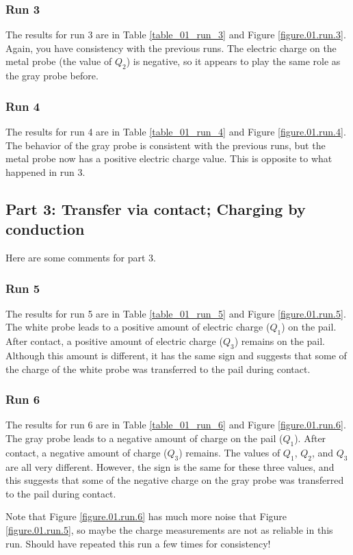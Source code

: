 \subsubsection{Run 3}
%
The results for run 3 are in Table \ref{table_01_run_3} and Figure \ref{figure.01.run.3}. Again, you have consistency with the previous runs. The electric charge on the metal probe (the value of $Q_{2}$) is negative, so it appears to play the same role as the gray probe before.
%
\subsubsection{Run 4}
%
The results for run 4 are in Table \ref{table_01_run_4} and Figure \ref{figure.01.run.4}. The behavior of the gray probe is consistent with the previous runs, but the metal probe now has a positive electric charge value. This is opposite to what happened in run 3.
%
\subsection{Part 3: Transfer via contact; Charging by conduction}
%
Here are some comments for part 3.
%
\subsubsection{Run 5}
%
The results for run 5 are in Table \ref{table_01_run_5} and Figure \ref{figure.01.run.5}. The white probe leads to a positive amount of electric charge ($Q_{1}$) on the pail. After contact, a positive amount of electric charge ($Q_{3}$) remains on the pail. Although this amount is different, it has the same sign and suggests that some of the charge of the white probe was transferred to the pail during contact.
%
\subsubsection{Run 6}
%
The results for run 6 are in Table \ref{table_01_run_6} and Figure \ref{figure.01.run.6}. The gray probe leads to a negative amount of charge on the pail ($Q_{1}$). After contact, a negative amount of charge ($Q_{3}$) remains. The values of $Q_{1}$, $Q_{2}$, and $Q_{3}$ are all very different. However, the sign is the same for these three values, and this suggests that some of the negative charge on the gray probe was transferred to the pail during contact.

Note that Figure \ref{figure.01.run.6} has much more noise that Figure \ref{figure.01.run.5}, so maybe the charge measurements are not as reliable in this run. Should have repeated this run a few times for consistency!
%
